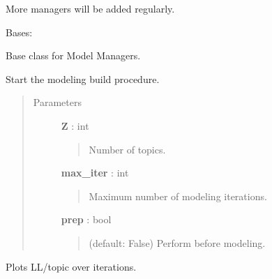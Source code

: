 \documentclass[letterpaper,10pt,english]{sphinxmanual}
\begin{document}
More managers will be added regularly.

\begin{fulllineitems}
\label{tethne.model.managers:tethne.model.managers.ModelManager}
Bases: 

Base class for Model Managers.

\begin{fulllineitems}
\label{tethne.model.managers:tethne.model.managers.ModelManager.build}
Start the modeling build procedure.
\begin{quote}\begin{description}
\item[{Parameters}] \leavevmode
\textbf{Z} : int
\begin{quote}

Number of topics.
\end{quote}

\textbf{max\_iter} : int
\begin{quote}

Maximum number of modeling iterations.
\end{quote}

\textbf{prep} : bool
\begin{quote}

(default: False) Perform  before modeling.
\end{quote}

\end{description}\end{quote}

\end{fulllineitems}


\begin{fulllineitems}
\label{tethne.model.managers:tethne.model.managers.ModelManager.plot_ll}
Plots LL/topic over iterations.

\end{fulllineitems}



\end{fulllineitems}
\end{document}
